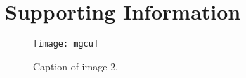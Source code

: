\chapter{Supporting Information}\label{app:app1}

\begin{figure}[h]
	\centering
	\texttt{[image: mgcu]}
	\caption{Caption of image 2.}
	\label{fig: img2}
\end{figure}